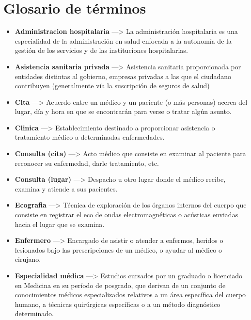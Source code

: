 \documentclass[11pt,a4paper]{article}
\begin{document}
\section{Glosario de términos} %
\label{sec:glosario_de_términos}

\begin{itemize}
	\item \textbf{Administracion hospitalaria} ---> La administración hospitalaria es una especialidad de la administración en salud enfocada a la autonomía de la gestión de los servicios y de las instituciones hospitalarias.
	
	\item \textbf{Asistencia sanitaria privada} ---> Asistencia sanitaria proporcionada por entidades distintas al gobierno, empresas privadas a las que el ciudadano contribuyen (generalmente vía la suscripción de seguros de salud)
	
	\item \textbf{Cita} ---> Acuerdo entre un médico y un paciente (o más personas) acerca del lugar, día y hora en que se encontrarán para verse o tratar algún asunto.
	
	\item \textbf{Clinica} ---> Establecimiento destinado a proporcionar asistencia o tratamiento médico a determinadas enfermedades.
	
	\item \textbf{Consulta (cita)} ---> Acto médico que consiste en examinar al paciente para reconocer su enfermedad, darle tratamiento, etc.
	
	\item \textbf{Consulta (lugar)} ---> Despacho u otro lugar donde el médico recibe, examina y atiende a sus pacientes.
	
	\item \textbf{Ecografia} ---> Técnica de exploración de los órganos internos del cuerpo que consiste en registrar el eco de ondas electromagnéticas o acústicas enviadas hacia el lugar que se examina.
	
	\item \textbf{Enfermero} ---> Encargado de asistir o atender a enfermos, heridos o lesionados bajo las prescripciones de un médico, o ayudar al médico o cirujano.
	
	\item \textbf{Especialidad médica} ---> Estudios cursados por un graduado o licenciado en Medicina en su período de posgrado, que derivan de un conjunto de conocimientos médicos especializados relativos a un área específica del cuerpo humano, a técnicas quirúrgicas específicas o a un método diagnóstico determinado.
	

\end{itemize}
\end{document}
